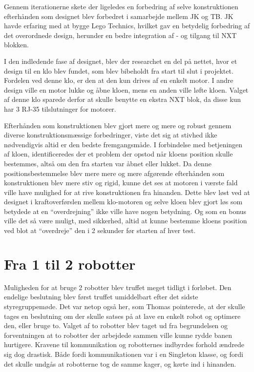 Gennem iterationerne skete der ligeledes en forbedring af selve konstruktionen efterhånden som designet blev forbedret i samarbejde mellem JK og TB. JK havde erfaring med at bygge Lego Technics, hvilket gav en betydelig forbedring af det overordnede design, herunder en bedre integration af - og tilgang til NXT blokken.

I den indledende fase af designet, blev der researchet en del på nettet, hvor et design til en klo blev fundet, som blev bibeholdt fra start til slut i projektet. Fordelen ved denne klo, er den at den kun drives af en enkelt motor. I andre design ville en motor lukke og åbne kloen, mens en anden ville løfte kloen. Valget af denne klo sparede derfor at skulle benytte en ekstra NXT blok, da disse kun har 3 RJ-35 tilslutninger for motorer.

Efterhånden som konstruktionen blev gjort mere og mere og robust gennem diverse konstruktionsmæssige forbedringer, viste det sig at stivhed ikke nødvendigvis altid er den bedste fremgangsmåde.
I forbindelse med betjeningen af kloen, identificeredes der et problem der opstod når kloens position skulle bestemmes, altså om den fra starten var åbnet eller lukket. Da denne positionsbestemmelse blev mere mere og mere afgørende efterhånden som konstruktionen blev mere stiv og rigid, kunne det ses at motoren i værste fald ville have mulighed for at rive konstruktionen fra hinanden. Dette blev løst ved at designet i kraftoverførslen mellem klo-motoren og selve kloen blev gjort løs som betydede at en "`overdrejning"' ikke ville have nogen betydning. Og som en bonus ville det så være muligt, med sikkerhed, altid at kunne bestemme kloens position ved blot at "`overdreje"' den i 2 sekunder før starten af hver test.

\section{Fra 1 til 2 robotter}
Muligheden for at bruge 2 robotter blev truffet meget tidligt i forløbet. Den endelige beslutning blev først truffet umiddelbart efter det sidste styregruppemøde. Det var netop også her, som Thomas pointerede, at der skulle tages en beslutning om der skulle satses på at lave en enkelt robot og optimere den, eller bruge to. Valget af to robotter blev taget ud fra begrundelsen og forventningen at to robotter der arbejdede sammen ville kunne rydde banen hurtigere. Kravene til kommunikation og robotternes indbyrdes forhold ændrede sig dog drastisk. Både fordi kommunikationen var i en Singleton klasse, og fordi det skulle undgås at robotterne tog de samme kager, og kørte ind i hinanden.

